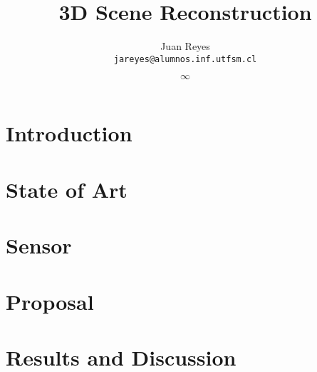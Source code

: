 \documentclass[spanish,english,12pt,letterpaper,oneside]{book}
\title{3D Scene Reconstruction}
\author{
  Juan Reyes \\ \texttt{jareyes@alumnos.inf.utfsm.cl}
}
\date{$\infty$}
\begin{document}
\frontmatter







\tableofcontents

{}
\listoffigures
{}
\listoftables

\mainmatter

\chapter{Introduction}
\label{introduccion}



\chapter{State of Art}


\chapter{Sensor}


\chapter{Proposal}









\chapter{Results and Discussion}




%

\end{document}
